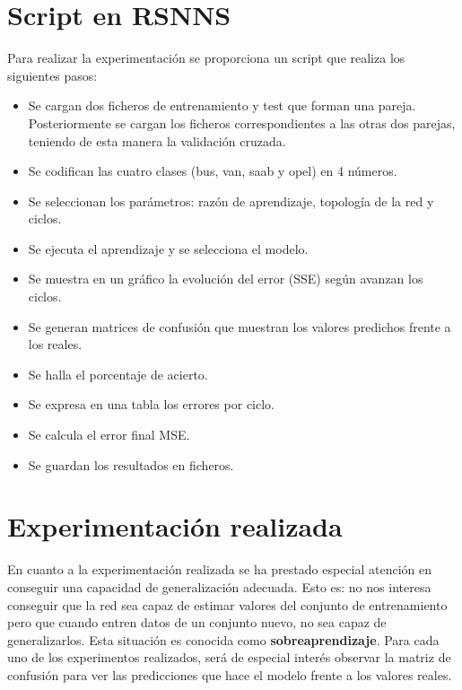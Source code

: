 \documentclass[11pt,spanish,listoffigures,listoftables]{workluis}
\begin{document}
\section{Script en RSNNS}

\par Para realizar la experimentación se proporciona un script que realiza los siguientes pasos:

\begin{itemize}
\item Se cargan dos ficheros de entrenamiento y test que forman una pareja. Posteriormente se cargan los ficheros correspondientes a las otras dos parejas, teniendo de esta manera la validación cruzada.
\item Se codifican las cuatro clases (bus, van, saab y opel) en 4 números.
\item Se seleccionan los parámetros: razón de aprendizaje, topología de la red y ciclos.
\item Se ejecuta el aprendizaje y se selecciona el modelo.
\item Se muestra en un gráfico la evolución del error (SSE) según avanzan los ciclos.
\item Se generan matrices de confusión que muestran los valores predichos frente a los reales.
\item Se halla el porcentaje de acierto.
\item Se expresa en una tabla los errores por ciclo.
\item Se calcula el error final MSE.
\item Se guardan los resultados en ficheros.
\end{itemize}

\section{Experimentación realizada}

\par En cuanto a la experimentación realizada se ha prestado especial atención en conseguir una capacidad de generalización adecuada. Esto es: no nos interesa conseguir que la red sea capaz de estimar valores del conjunto de entrenamiento pero que cuando entren datos de un conjunto nuevo, no sea capaz de generalizarlos. Esta situación es conocida como \textbf{sobreaprendizaje}. Para cada uno de los experimentos realizados, será de especial interés observar la matriz de confusión para ver las predicciones que hace el modelo frente a los valores reales.
\end{document}

